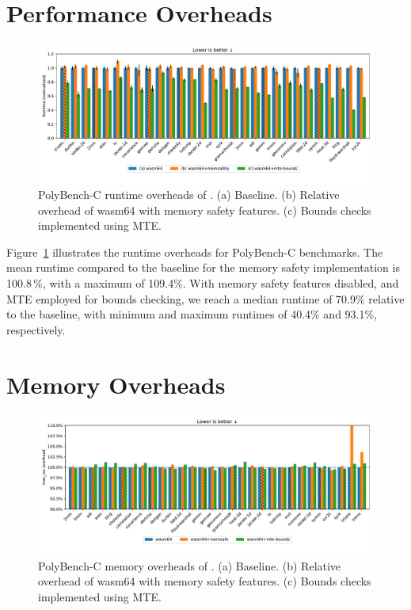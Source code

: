 \section{Performance Overheads}

\begin{figure}[ht]
    \centering
    \includegraphics[width=\textwidth]{./plots/runtimes}
    \caption{{PolyBench-C runtime overheads of {\projectname{}}. (a) Baseline. (b) Relative overhead of wasm64 with memory safety features. (c) Bounds checks implemented using MTE.}{}}
    \label{fig:runtime_overheads}
\end{figure}

Figure~\ref{fig:runtime_overheads} illustrates the runtime overheads for PolyBench-C benchmarks.
The mean runtime compared to the baseline for the memory safety implementation is 100.8\,\%, with a maximum of 109.4\%.
With memory safety features disabled, and MTE employed for bounds checking, we reach a median runtime of 70.9\% relative to the baseline, with minimum and maximum runtimes of 40.4\% and 93.1\%, respectively.


\section{Memory Overheads}\label{sec:memory-overheads}

\begin{figure}[ht]
    \centering
    \includegraphics[width=\textwidth]{./plots/mem-overhead}
    \caption{{PolyBench-C memory overheads of {\projectname{}}. (a) Baseline. (b) Relative overhead of wasm64 with memory safety features. (c) Bounds checks implemented using MTE.}{}}
    \label{fig:memory_overheads}
\end{figure}

